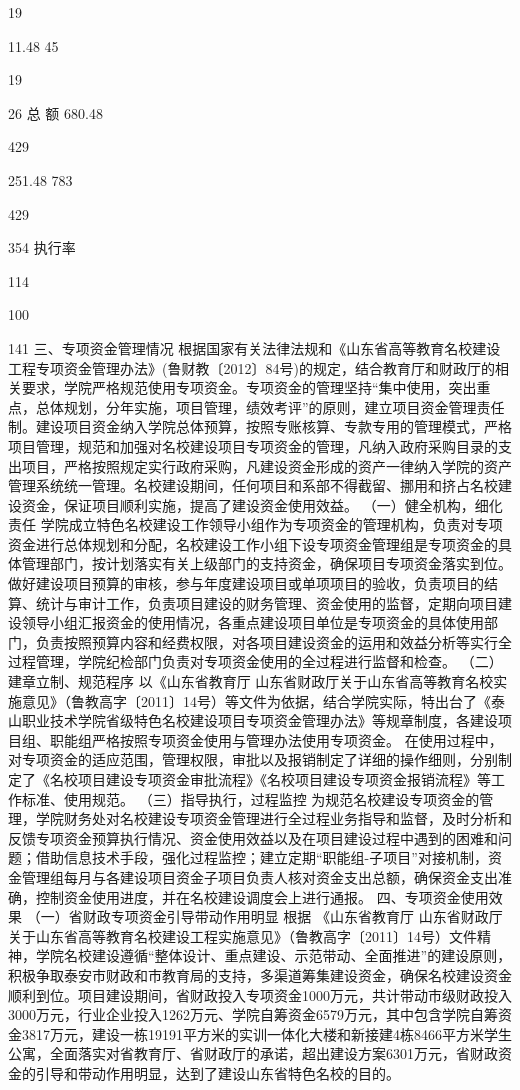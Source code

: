 19

11.48
45 

19

26
总    额
680.48

429

251.48
783

429

354
执行率%

114

100

141
三、专项资金管理情况
根据国家有关法律法规和《山东省高等教育名校建设工程专项资金管理办法》(鲁财教〔2012〕84号)的规定，结合教育厅和财政厅的相关要求，学院严格规范使用专项资金。专项资金的管理坚持“集中使用，突出重点，总体规划，分年实施，项目管理，绩效考评”的原则，建立项目资金管理责任制。建设项目资金纳入学院总体预算，按照专账核算、专款专用的管理模式，严格项目管理，规范和加强对名校建设项目专项资金的管理，凡纳入政府采购目录的支出项目，严格按照规定实行政府采购，凡建设资金形成的资产一律纳入学院的资产管理系统统一管理。名校建设期间，任何项目和系部不得截留、挪用和挤占名校建设资金，保证项目顺利实施，提高了建设资金使用效益。
（一）健全机构，细化责任
学院成立特色名校建设工作领导小组作为专项资金的管理机构，负责对专项资金进行总体规划和分配，名校建设工作小组下设专项资金管理组是专项资金的具体管理部门，按计划落实有关上级部门的支持资金，确保项目专项资金落实到位。做好建设项目预算的审核，参与年度建设项目或单项项目的验收，负责项目的结算、统计与审计工作，负责项目建设的财务管理、资金使用的监督，定期向项目建设领导小组汇报资金的使用情况，各重点建设项目单位是专项资金的具体使用部门，负责按照预算内容和经费权限，对各项目建设资金的运用和效益分析等实行全过程管理，学院纪检部门负责对专项资金使用的全过程进行监督和检查。
（二）建章立制、规范程序
以《山东省教育厅  山东省财政厅关于山东省高等教育名校实施意见》（鲁教高字〔2011〕14号）等文件为依据，结合学院实际，特出台了《泰山职业技术学院省级特色名校建设项目专项资金管理办法》等规章制度，各建设项目组、职能组严格按照专项资金使用与管理办法使用专项资金。
在使用过程中，对专项资金的适应范围，管理权限，审批以及报销制定了详细的操作细则，分别制定了《名校项目建设专项资金审批流程》《名校项目建设专项资金报销流程》等工作标准、使用规范。
（三）指导执行，过程监控
为规范名校建设专项资金的管理，学院财务处对名校建设专项资金管理进行全过程业务指导和监督，及时分析和反馈专项资金预算执行情况、资金使用效益以及在项目建设过程中遇到的困难和问题；借助信息技术手段，强化过程监控；建立定期“职能组-子项目”对接机制，资金管理组每月与各建设项目资金子项目负责人核对资金支出总额，确保资金支出准确，控制资金使用进度，并在名校建设调度会上进行通报。
四、专项资金使用效果
（一）省财政专项资金引导带动作用明显
根据 《山东省教育厅  山东省财政厅关于山东省高等教育名校建设工程实施意见》（鲁教高字〔2011〕14号）文件精神，学院名校建设遵循“整体设计、重点建设、示范带动、全面推进”的建设原则，积极争取泰安市财政和市教育局的支持，多渠道筹集建设资金，确保名校建设资金顺利到位。项目建设期间，省财政投入专项资金1000万元，共计带动市级财政投入3000万元，行业企业投入1262万元、学院自筹资金6579万元，其中包含学院自筹资金3817万元，建设一栋19191平方米的实训一体化大楼和新接建4栋8466平方米学生公寓，全面落实对省教育厅、省财政厅的承诺，超出建设方案6301万元，省财政资金的引导和带动作用明显，达到了建设山东省特色名校的目的。
